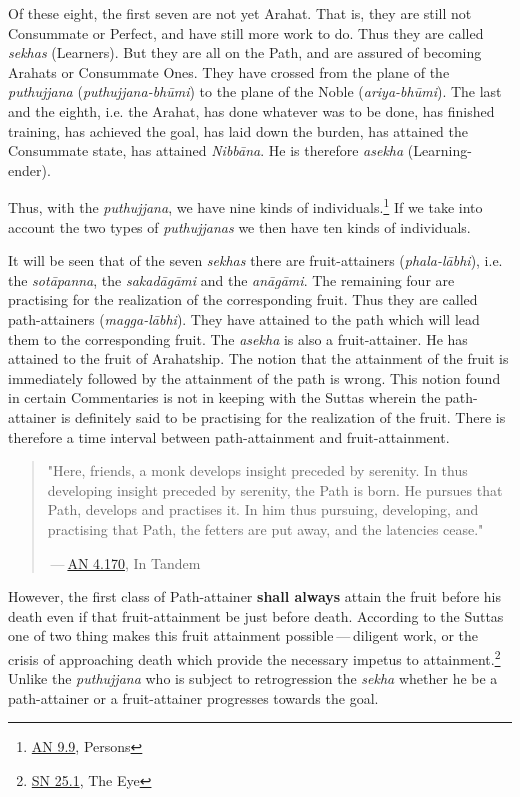 Of these eight, the first seven are not yet Arahat. That is, they are still not Consummate or Perfect, and have still more work to do. Thus they are called \emph{sekhas} (Learners). But they are all on the Path, and are assured of becoming Arahats or Consummate Ones. They have crossed from the plane of the \emph{puthujjana} (\emph{puthujjana-bhūmi}) to the plane of the Noble (\emph{ariya-bhūmi}). The last and the eighth, i.e. the Arahat, has done whatever was to be done, has finished training, has achieved the goal, has laid down the burden, has attained the Consummate state, has attained \emph{Nibbāna}. He is therefore \emph{asekha} (Learning-ender).

Thus, with the \emph{puthujjana}, we have nine kinds of individuals.\footnote{\href{https://suttacentral.net/an9.9/en/sujato}{AN 9.9}, Persons} If we take into account the two types of \emph{puthujjanas} we then have ten kinds of individuals.

It will be seen that of the seven \emph{sekhas} there are fruit-attainers (\emph{phala-lābhi}), i.e. the \emph{sotāpanna}, the \emph{sakadāgāmi} and the \emph{anāgāmi}. The remaining four are practising for the realization of the corresponding fruit. Thus they are called path-attainers (\emph{magga-lābhi}). They have attained to the path which will lead them to the corresponding fruit. The \emph{asekha} is also a fruit-attainer. He has attained to the fruit of Arahatship. The notion that the attainment of the fruit is immediately followed by the attainment of the path is wrong. This notion found in certain Commentaries is not in keeping with the Suttas wherein the path-attainer is definitely said to be practising for the realization of the fruit. There is therefore a time interval between path-attainment and fruit-attainment.

\begin{quote}
"Here, friends, a monk develops insight preceded by serenity. In thus developing insight preceded by serenity, the Path is born. He pursues that Path, develops and practises it. In him thus pursuing, developing, and practising that Path, the fetters are put away, and the latencies cease."

 --- \href{https://suttacentral.net/an4.170/en/thanissaro}{AN 4.170}, In Tandem
\end{quote}

However, the first class of Path-attainer \textbf{shall always} attain the fruit before his death even if that fruit-attainment be just before death. According to the Suttas one of two thing makes this fruit attainment possible --- diligent work, or the crisis of approaching death which provide the necessary impetus to attainment.\footnote{\href{https://suttacentral.net/sn25.1/en/sujato}{SN 25.1}, The Eye} Unlike the \emph{puthujjana} who is subject to retrogression the \emph{sekha} whether he be a path-attainer or a fruit-attainer progresses towards the goal.


